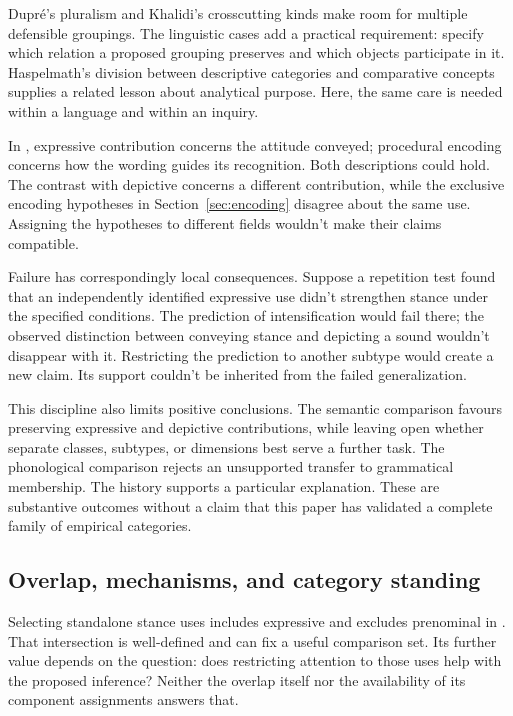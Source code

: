 \documentclass[12pt]{article}
\begin{document}
Dupr\'e's pluralism and Khalidi's crosscutting kinds make room for
multiple defensible groupings. The linguistic cases add a practical
requirement: specify which relation a proposed grouping preserves and
which objects participate in it. Haspelmath's division between descriptive
categories and comparative concepts supplies a related lesson about
analytical purpose. Here, the same care is needed within a language
and within an inquiry.

In , expressive contribution concerns
the attitude conveyed; procedural encoding concerns how the wording
guides its recognition. Both descriptions could hold. The contrast with
depictive  concerns a different contribution, while the
exclusive encoding hypotheses in Section~\ref{sec:encoding} disagree about
the same use. Assigning the hypotheses to different fields wouldn't
make their claims compatible.

Failure has correspondingly local consequences. Suppose a repetition
test found that an independently identified expressive use didn't
strengthen stance under the specified conditions. The prediction of
intensification would fail there; the observed distinction between
conveying stance and depicting a sound wouldn't disappear with it.
Restricting the prediction to another subtype would create a new
claim. Its support couldn't be inherited from the failed generalization.

This discipline also limits positive conclusions. The semantic comparison
favours preserving expressive and depictive contributions, while leaving
open whether separate classes, subtypes, or dimensions best serve a
further task. The phonological comparison rejects an unsupported transfer
to grammatical membership. The  history supports a particular
explanation. These are substantive outcomes without a claim that this
paper has validated a complete family of empirical categories.

\subsection{Overlap, mechanisms, and category standing}

Selecting standalone stance uses includes expressive 
and excludes prenominal  in . That
intersection is well-defined and can fix a useful comparison set.
Its further value depends on the question: does restricting attention
to those uses help with the proposed inference? Neither the overlap
itself nor the availability of its component assignments answers that.
\end{document}

